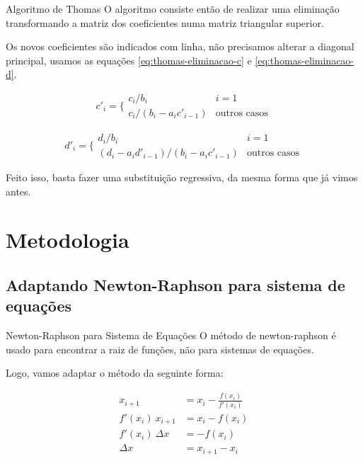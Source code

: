 \documentclass[11pt]{beamer}
\begin{document}
\begin{frame}{Algoritmo de Thomas}
    O algoritmo consiste então de realizar uma eliminação transformando a matriz dos coeficientes numa matriz triangular superior.
    
    \vspace{0.2cm}
    
    Os novos coeficientes são indicados com linha, não precisamos alterar a diagonal principal, usamos as equações \ref{eq:thomas-eliminacao-c} e \ref{eq:thomas-eliminacao-d}.

    \begin{equation}
        c'_i = \Bigg\{\begin{matrix}
            c_i/b_i & i=1 \\[0.1em]
            c_i/(b_i-a_ic'_{i-1}) & \text{outros casos}
        \end{matrix}
        \label{eq:thomas-eliminacao-c}
    \end{equation}
    
    \begin{equation}
        d'_i = \Bigg\{\begin{matrix}
            d_i/b_i & i=1 \\[0.1em]
            (d_i-a_id'_{i-1})/(b_i-a_ic'_{i-1}) & \text{outros casos}
        \end{matrix}
        \label{eq:thomas-eliminacao-d}
    \end{equation}

    Feito isso, basta fazer uma substituição regressiva, da mesma forma que já vimos antes.
\end{frame}

\section{Metodologia}

\subsection{Adaptando Newton-Raphson para sistema de equações}

\begin{frame}{Newton-Raphson para Sistema de Equações}
    O método de newton-raphson é usado para encontrar a raiz de funções, não para sistemas de equações.

    \vspace{0.3cm}

    Logo, vamos adaptar o método da seguinte forma:

    \begin{equation*}
    \begin{split}
        x_{i+1} & = x_i - \frac{f(x_i)}{f'(x_i)} \\
        f'(x_i)\ x_{i+1} & = x_i - f(x_i) \\
        f'(x_i)\ \Delta x & = -f(x_i) \\
        \Delta x & = x_{i+1} - x_i
    \end{split}
    \end{equation*}

\end{frame}
\end{document}
